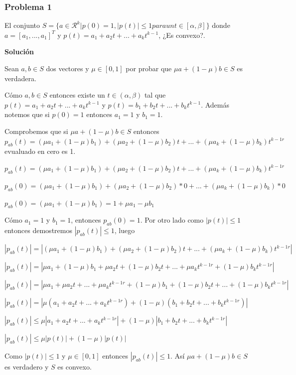 \documentclass[journal]{IEEEtran}
\begin{document}
\subsubsection{Problema 1}

El conjunto $S = \{ a \in \mathcal{R}^k | p(0)=1, |p(t)| \le 1 para un t \in [\alpha, \beta] \}$ donde $a = [a_1, ..., a_1]^T$ y $p(t) = a_1 + a_2t+ ... + a_kt^{k-1}$, ¿Es convexo?.

\textbf{Solución}

Sean $a, b \in S$ dos vectores y $\mu \in [0,1]$ por probar que $\mu a + (1-\mu)b \in S$ es verdadera.

Cómo $a, b \in S$ entonces existe un $t \in (\alpha, \beta)$ tal que $p(t) = a_1 + a_2t + ... + a_kt^{k-1}$ y $p(t) = b_1 + b_2t + ... + b_kt^{k-1}$.
Además notemos que si $p(0) = 1$ entonces $a_1 = 1$ y $b_1=1$.

Comprobemos que si $\mu a + (1-\mu)b \in S$ entonces $p_{ab}(t) = (\mu a_1 + (1-\mu)b_1) + (\mu a_2 + (1-\mu)b_2)t + ... + (\mu a_k + (1-\mu)b_k)t^{k-1r}$ evualuado en cero es 1.

$p_{ab}(t) = (\mu a_1 + (1-\mu)b_1) + (\mu a_2 + (1-\mu)b_2)t + ... + (\mu a_k + (1-\mu)b_k)t^{k-1r}$

$p_{ab}(0) = (\mu a_1 + (1-\mu)b_1) + (\mu a_2 + (1-\mu)b_2)*0 + ... + (\mu a_k + (1-\mu)b_k)*0 $

$p_{ab}(0) = (\mu a_1 + (1-\mu)b_1) = 1 + \mu a_1 -\mu b_1$

Cómo $a_1 = 1$ y $b_1=1$, entonces $p_{ab}(0) = 1$. Por otro lado como $|p(t)| \le 1$ entonces demostremos $|p_{ab}(t)| \le 1$, luego

$|p_{ab}(t)| = |(\mu a_1 + (1-\mu)b_1) + (\mu a_2 + (1-\mu)b_2)t + ... + (\mu a_k + (1-\mu)b_k)t^{k-1r}|$

$|p_{ab}(t)| = |\mu a_1 + (1-\mu)b_1 + \mu a_2 t + (1-\mu)b_2 t + ... + \mu a_k t^{k-1r} + (1-\mu)b_k t^{k-1r}|$

$|p_{ab}(t)| = |\mu a_1 + \mu a_2 t +...+ \mu a_k t^{k-1r} + (1-\mu)b_1 + (1-\mu)b_2 t +...+ (1-\mu)b_k t^{k-1r}|$

$|p_{ab}(t)| = |\mu (a_1 + a_2 t +...+ a_k t^{k-1r}) + (1-\mu) (b_1 + b_2 t +...+ b_k t^{k-1r})|$

$|p_{ab}(t)| \le \mu |a_1 + a_2 t +...+ a_k t^{k-1r}| + (1-\mu) |b_1 + b_2 t +...+ b_k t^{k-1r}|$

$|p_{ab}(t)| \le \mu |p(t)| + (1-\mu) |p(t)|$

Como $|p(t)| \le 1$ y $\mu \in [0,1]$ entonces $|p_{ab}(t)| \le 1$. Así $\mu a + (1-\mu)b \in S$ es verdadero y $S$ es convexo.
\end{document}
